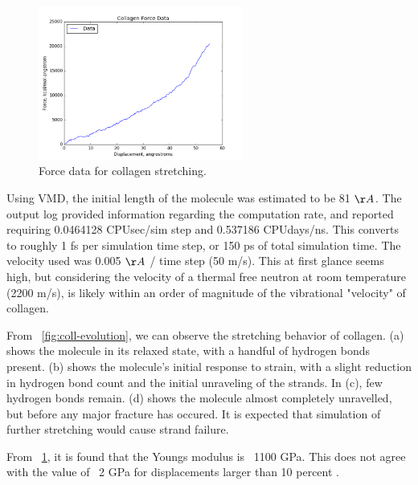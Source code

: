 \documentclass[11pt]{report}
\begin{document}
        \begin{figure}[!htb]
            \label{fig:collagen-young}
            \centering
            \includegraphics[width=0.6\textwidth]{collagen-stress-strain.png}
            \caption{Force data for collagen stretching.}
        \end{figure}


        Using VMD, the initial length of the molecule was estimated to be 81 $\AA$.  The output log provided information regarding the computation rate, and reported requiring 0.0464128 CPUsec/sim step and 0.537186 CPUdays/ns.  This converts to roughly 1 fs per simulation time step, or 150 ps of total simulation time.  The velocity used was 0.005 $\AA$ / time step (50 m/s).  This at first glance seems high, but considering the velocity of a thermal free neutron at room temperature (2200 m/s), is likely within an order of magnitude of the vibrational "velocity" of collagen.

        From ~\ref{fig:coll-evolution}, we can observe the stretching behavior of collagen.  (a) shows the molecule in its relaxed state, with a handful of hydrogen bonds present.  (b) shows the molecule's initial response to strain, with a slight reduction in hydrogen bond count and the initial unraveling of the strands.  In (c), few hydrogen bonds remain.  (d) shows the molecule almost completely unravelled, but before any major fracture has occured.  It is expected that simulation of further stretching would cause strand failure.

        From ~\ref{fig:collagen-young}, it is found that the Youngs modulus is ~1100 GPa. This does not agree with the value of ~2 GPa for displacements larger than 10 percent \cite{Gautieri}.
\end{document}
